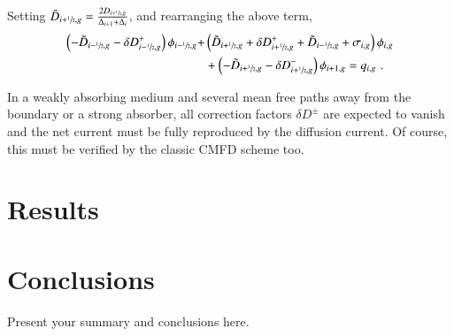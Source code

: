 \documentclass[review,3p,onecolumn,sort&compress]{elsarticle}
\newcommand{\hzi}{\ensuremath{\sfrac{1}{2}}}
\newcommand{\dx}{\Delta}
\newcommand{\dd}{\delta D}
\newcommand{\tild}{\tilde{D}}
\begin{document}
Setting $\tild_{i+\hzi,g} = \frac{2D_{i+\hzi,g}}{\dx_{i+1}+\dx_{i}}$, and rearranging the above term, 
\begin{equation}
	\label{eq:pCMFD-rearrange}
	\begin{split}
	\left(-\tild_{i-\hzi,g}-\dd^+_{i-\hzi,g}\right)\phi_{i-\hzi,g} + &\left( \tild_{i+\hzi,g} + \dd^+_{i+\hzi,g}+ \tild_{i-\hzi,g} + \sigma_{i,g}\right)\phi_{i,g} \\
	&+ \left( -\tild_{i+\hzi,g} - \dd^-_{i+\hzi,g}\right)\phi_{i+1,g} = q_{i,g}\,\,.
	\end{split}
\end{equation}

In a weakly absorbing medium and several mean free paths away from the boundary or a strong absorber, all correction factors $\delta D^\pm$ are expected to vanish and the net current must be fully reproduced by the diffusion current. Of course, this must be verified by the classic CMFD scheme too.


\section{Results}
\label{sec:res}


\section{Conclusions}
\label{sec:conc}

Present your summary and conclusions here.




\end{document}
